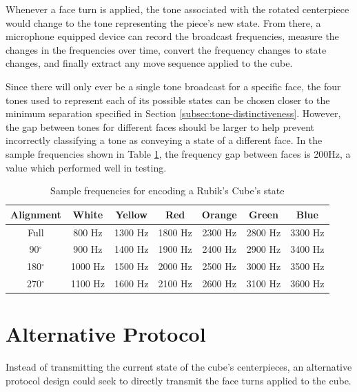 Whenever a face turn is applied, the tone associated with the rotated
centerpiece would change to the tone representing the piece's new
state. From there, a microphone equipped device can record the
broadcast frequencies, measure the changes in the frequencies over
time, convert the frequency changes to state changes, and finally
extract any move sequence applied to the cube.

Since there will only ever be a single tone broadcast for a specific
face, the four tones used to represent each of its possible states can
be chosen closer to the minimum separation specified in Section
\ref{subsec:tone-distinctiveness}. However, the gap between tones for
different faces should be larger to help prevent incorrectly
classifying a tone as conveying a state of a different face. In the
sample frequencies shown in Table \ref{table:centerpiece-frequencies},
the frequency gap between faces is 200Hz, a value which performed well
in testing.

\begin{table}[h]
    \centering
    \caption{Sample frequencies for encoding a Rubik's Cube's state}
    \label{table:centerpiece-frequencies}
    \begin{tabular}{ | c | c | c | c | c | c | c | }
        \hline
        Alignment & White & Yellow & Red & Orange & Green & Blue\\
        \hline
        \hline
        Full & 800 Hz & 1300 Hz & 1800 Hz & 2300 Hz & 2800 Hz & 3300 Hz\\
        90$^\circ$ & 900 Hz & 1400 Hz & 1900 Hz & 2400 Hz & 2900 Hz & 3400 Hz\\
        180$^\circ$ & 1000 Hz & 1500 Hz & 2000 Hz & 2500 Hz & 3000 Hz & 3500 Hz\\
        270$^\circ$ & 1100 Hz & 1600 Hz & 2100 Hz & 2600 Hz & 3100 Hz & 3600 Hz\\
        \hline
    \end{tabular}
\end{table}


\section{Alternative Protocol}
\label{sec:alternatives}

Instead of transmitting the current state of the cube's centerpieces,
an alternative protocol design could seek to directly transmit the face
turns applied to the cube.

